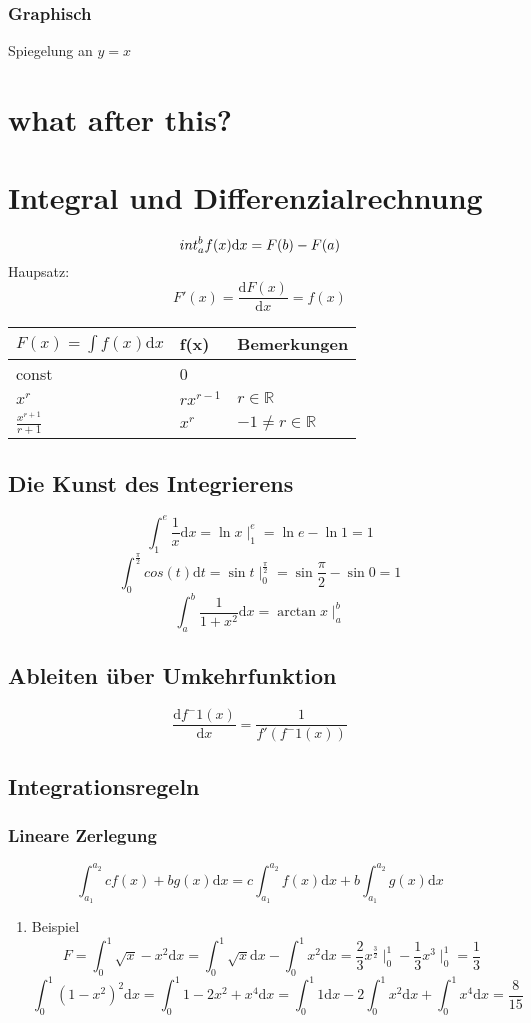 \documentclass[11pt]{article}
\begin{document}
\subsubsection{Graphisch}
\label{sec-9-1-2}
Spiegelung an $y=x$
\section{what after this?}
\label{sec-10}
\section{Integral und Differenzialrechnung}
\label{sec-11}
\[\\int_a^b f(x)\mathrm{d}x=F(b) - F(a)\]
Haupsatz:
\[F'(x) = \frac{\mathrm{d}F(x)}{\mathrm{d}x} = f(x)\]
\begin{center}
\begin{tabular}{lll}
$F(x)=\int f(x)\mathrm{d}x$ & f(x) & Bemerkungen\\
\hline
const & 0 & \\
$x^r$ & $r x^{r-1}$ & $r\in\mathbb{R}$\\
$\frac{x^{r+1}}{r+1}$ & $x^r$ & $-1 \neq  r\in\mathbb{R}$\\
\end{tabular}
\end{center}
\subsection{Die Kunst des Integrierens}
\label{sec-11-1}
\[\int_1^e \frac{1}{x}\mathrm{d}x = \ln{x}\mid_1^e = \ln{e} - \ln{1} = 1\]
\[\int_0^{\frac{\pi}{2}} cos(t)\mathrm{d}t=\sin{t}\mid_0^{\frac{\pi}{2}} = \sin{\frac{\pi}{2}} - \sin{0} = 1\]
\[\int_a^b\frac{1}{1+x^2}\mathrm{d}x = \arctan{x}\mid_a^b\]
\subsection{Ableiten über Umkehrfunktion}
\label{sec-11-2}
\[\frac{\mathrm{d}f^-1(x)}{\mathrm{d}x}=\frac{1}{f'(f^-1(x))}\]
\subsection{Integrationsregeln}
\label{sec-11-3}
\subsubsection{Lineare Zerlegung}
\label{sec-11-3-1}
\[\int_{a_1}^{a_2} c f(x) + b g(x)\mathrm{d}x = c\int_{a_1}^{a_2}f(x)\mathrm{d}x + b\int_{a_1}^{a_2}g(x)\mathrm{d}x\]
\begin{enumerate}
\item Beispiel
\label{sec-11-3-1-1}
\[F=\int_0^1 \sqrt{x} - x^2\mathrm{d}x = \int_0^1 \sqrt{x}\mathrm{d}x - \int_0^1 x^2\mathrm{d}x = \frac{2}{3}x^\frac{3}{2}\mid_0^1 - \frac{1}{3}x^3\mid_0^1 = \frac{1}{3}\]
\[\int_0^1 (1-x^2)^2\mathrm{d}x = \int_0^1 1-2x^2 + x^4\mathrm{d}x = \int_0^1 1\mathrm{d}x - 2\int_0^1 x^2\mathrm{d}x + \int_0^1 x^4\mathrm{d}x = \frac{8}{15}\]
\end{enumerate}
\end{document}
